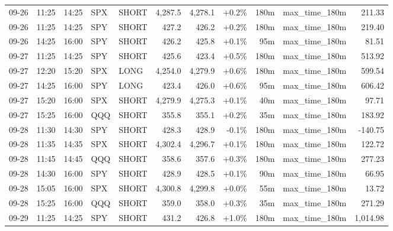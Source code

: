 \documentclass[11pt,a4paper,twoside]{article}
\begin{document}
\begin{center}
\begin{longtable}{>{\color{txtmain}}l l l l l r r r r >{\color{txtmain}}l r}
09-26 & 11:25 & 14:25 & SPX & SHORT & 4,287.5 & 4,278.1 & \textcolor{wingreen}{+0.2\%} & 180m & max\_time\_180m & \textcolor{wingreen}{211.33} \\
09-26 & 11:25 & 14:25 & SPY & SHORT & 427.2 & 426.2 & \textcolor{wingreen}{+0.2\%} & 180m & max\_time\_180m & \textcolor{wingreen}{219.40} \\
09-26 & 14:25 & 16:00 & SPY & SHORT & 426.2 & 425.8 & \textcolor{wingreen}{+0.1\%} & 95m & max\_time\_180m & \textcolor{wingreen}{81.51} \\
09-27 & 11:25 & 14:25 & SPY & SHORT & 425.6 & 423.4 & \textcolor{wingreen}{+0.5\%} & 180m & max\_time\_180m & \textcolor{wingreen}{513.92} \\
09-27 & 12:20 & 15:20 & SPX & LONG & 4,254.0 & 4,279.9 & \textcolor{wingreen}{+0.6\%} & 180m & max\_time\_180m & \textcolor{wingreen}{599.54} \\
09-27 & 14:25 & 16:00 & SPY & LONG & 423.4 & 426.0 & \textcolor{wingreen}{+0.6\%} & 95m & max\_time\_180m & \textcolor{wingreen}{606.42} \\
09-27 & 15:20 & 16:00 & SPX & SHORT & 4,279.9 & 4,275.3 & \textcolor{wingreen}{+0.1\%} & 40m & max\_time\_180m & \textcolor{wingreen}{97.71} \\
09-27 & 15:25 & 16:00 & QQQ & SHORT & 355.8 & 355.1 & \textcolor{wingreen}{+0.2\%} & 35m & max\_time\_180m & \textcolor{wingreen}{183.92} \\
09-28 & 11:30 & 14:30 & SPY & SHORT & 428.3 & 428.9 & \textcolor{lossred}{-0.1\%} & 180m & max\_time\_180m & \textcolor{lossred}{-140.75} \\
09-28 & 11:35 & 14:35 & SPX & SHORT & 4,302.4 & 4,296.7 & \textcolor{wingreen}{+0.1\%} & 180m & max\_time\_180m & \textcolor{wingreen}{122.72} \\
09-28 & 11:45 & 14:45 & QQQ & SHORT & 358.6 & 357.6 & \textcolor{wingreen}{+0.3\%} & 180m & max\_time\_180m & \textcolor{wingreen}{277.23} \\
09-28 & 14:30 & 16:00 & SPY & SHORT & 428.9 & 428.5 & \textcolor{wingreen}{+0.1\%} & 90m & max\_time\_180m & \textcolor{wingreen}{66.95} \\
09-28 & 15:05 & 16:00 & SPX & SHORT & 4,300.8 & 4,299.8 & \textcolor{wingreen}{+0.0\%} & 55m & max\_time\_180m & \textcolor{wingreen}{13.72} \\
09-28 & 15:25 & 16:00 & QQQ & SHORT & 359.0 & 358.0 & \textcolor{wingreen}{+0.3\%} & 35m & max\_time\_180m & \textcolor{wingreen}{271.29} \\
09-29 & 11:25 & 14:25 & SPY & SHORT & 431.2 & 426.8 & \textcolor{wingreen}{+1.0\%} & 180m & max\_time\_180m & \textcolor{wingreen}{1,014.98} \\

\end{longtable}
\end{center}
\end{document}
